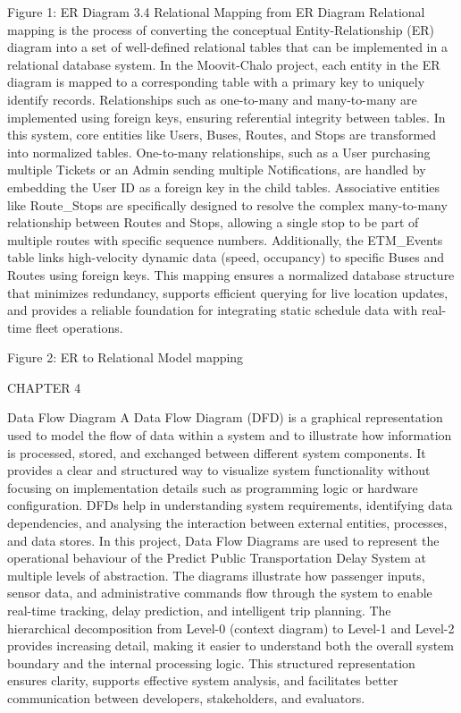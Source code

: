Figure 1: ER Diagram 
3.4	 Relational Mapping from ER Diagram
Relational mapping is the process of converting the conceptual Entity-Relationship (ER) diagram into a set of well-defined relational tables that can be implemented in a relational database system. In the Moovit-Chalo project, each entity in the ER diagram is mapped to a corresponding table with a primary key to uniquely identify records. Relationships such as one-to-many and many-to-many are implemented using foreign keys, ensuring referential integrity between tables.
In this system, core entities like Users, Buses, Routes, and Stops are transformed into normalized tables. One-to-many relationships, such as a User purchasing multiple Tickets or an Admin sending multiple Notifications, are handled by embedding the User ID as a foreign key in the child tables.
Associative entities like Route_Stops are specifically designed to resolve the complex many-to-many relationship between Routes and Stops, allowing a single stop to be part of multiple routes with specific sequence numbers. Additionally, the ETM_Events table links high-velocity dynamic data (speed, occupancy) to specific Buses and Routes using foreign keys. This mapping ensures a normalized database structure that minimizes redundancy, supports efficient querying for live location updates, and provides a reliable foundation for integrating static schedule data with real-time fleet operations.
                       

Figure 2: ER to Relational Model mapping 








CHAPTER 4

Data Flow Diagram
A Data Flow Diagram (DFD) is a graphical representation used to model the flow of data within a system and to illustrate how information is processed, stored, and exchanged between different system components. It provides a clear and structured way to visualize system functionality without focusing on implementation details such as programming logic or hardware configuration. DFDs help in understanding system requirements, identifying data dependencies, and analysing the interaction between external entities, processes, and data stores.
In this project, Data Flow Diagrams are used to represent the operational behaviour of the Predict Public Transportation Delay System at multiple levels of abstraction. The diagrams illustrate how passenger inputs, sensor data, and administrative commands flow through the system to enable real-time tracking, delay prediction, and intelligent trip planning. The hierarchical decomposition from Level-0 (context diagram) to Level-1 and Level-2 provides increasing detail, making it easier to understand both the overall system boundary and the internal processing logic. This structured representation ensures clarity, supports effective system analysis, and facilitates better communication between developers, stakeholders, and evaluators.

